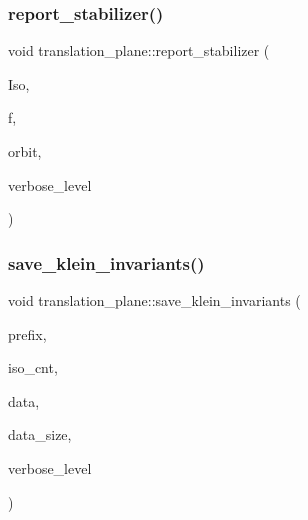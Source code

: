 \mbox{\label{classtranslation__plane_a30e86aef6d6c8c2df9770e82742207e6}} 
\subsubsection{\texorpdfstring{report\+\_\+stabilizer()}{report\_stabilizer()}}
{\footnotesize\ttfamily void translation\+\_\+plane\+::report\+\_\+stabilizer (\begin{DoxyParamCaption}\item[{\mbox{\hyperlink{classisomorph}{isomorph}} \&}]{Iso,  }\item[{ofstream \&}]{f,  }\item[{\mbox{\hyperlink{galois_8h_a09fddde158a3a20bd2dcadb609de11dc}{I\+NT}}}]{orbit,  }\item[{\mbox{\hyperlink{galois_8h_a09fddde158a3a20bd2dcadb609de11dc}{I\+NT}}}]{verbose\+\_\+level }\end{DoxyParamCaption})}

\mbox{\label{classtranslation__plane_a524d88c71493798d4059cbca586e11cf}} 
\subsubsection{\texorpdfstring{save\+\_\+klein\+\_\+invariants()}{save\_klein\_invariants()}}
{\footnotesize\ttfamily void translation\+\_\+plane\+::save\+\_\+klein\+\_\+invariants (\begin{DoxyParamCaption}\item[{\mbox{\hyperlink{galois_8h_ab6cc7b4aeb6ea31aba2b3fbfc83ff5e6}{B\+Y\+TE}} $\ast$}]{prefix,  }\item[{\mbox{\hyperlink{galois_8h_a09fddde158a3a20bd2dcadb609de11dc}{I\+NT}}}]{iso\+\_\+cnt,  }\item[{\mbox{\hyperlink{galois_8h_a09fddde158a3a20bd2dcadb609de11dc}{I\+NT}} $\ast$}]{data,  }\item[{\mbox{\hyperlink{galois_8h_a09fddde158a3a20bd2dcadb609de11dc}{I\+NT}}}]{data\+\_\+size,  }\item[{\mbox{\hyperlink{galois_8h_a09fddde158a3a20bd2dcadb609de11dc}{I\+NT}}}]{verbose\+\_\+level }\end{DoxyParamCaption})}

